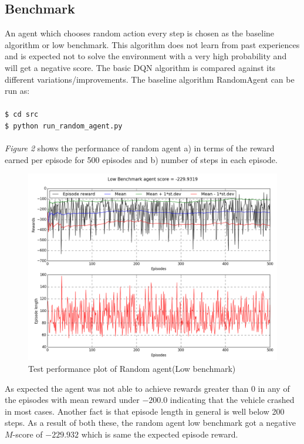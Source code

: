 \documentclass{article}
\begin{document}
\subsection*{Benchmark}
An agent which chooses random action every step is chosen as the baseline algorithm or low benchmark. This algorithm does not learn from past experiences and is expected not to solve the environment with a very high probability and will get a negative score. The basic DQN algorithm is compared against its different variations/improvements.
The baseline algorithm RandomAgent can be run as:\\
\texttt{\\\$ cd src}
\texttt{\\\$ python run\_random\_agent.py}\\\\
\textit{Figure 2} shows the performance of random agent a) in terms of the reward earned per episode for 500 episodes and b) number of steps in each episode.
\begin{figure}[H]
	\caption{Test performance plot of Random agent(Low benchmark)}
	\centering
	\includegraphics[width=13cm,trim={0 0 0 0},clip]{img/randomagent}
\end{figure}
As expected the agent was not able to achieve rewards greater than $0$ in any of the episodes with mean reward under $-200.0$ indicating that the vehicle crashed in most cases. Another fact is that episode length in general is well below 200 steps. As a result of both these, the random agent low benchmark got a negative $M$-score of $-229.932$ which is same the expected episode reward.\\\\
\end{document}
